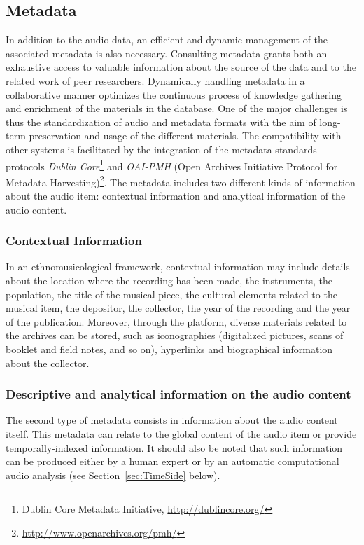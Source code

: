 \documentclass{sig-alternate}
\begin{document}
\subsection{Metadata}\label{sec:metadata}
In addition to the audio data, an efficient and dynamic management of the associated metadata is also necessary. Consulting metadata grants both an exhaustive access to valuable information about the source of the data and to the related work of peer researchers. 
Dynamically handling metadata in a collaborative manner optimizes the continuous process of knowledge gathering and enrichment of the materials in the database.  
One of the major challenges is thus the standardization of audio and metadata formats with the aim of long-term preservation and usage of the different materials.
The compatibility with other systems is facilitated by the integration of the metadata standards protocols \emph{Dublin Core}\footnote{{Dublin Core} Metadata Initiative, \url{http://dublincore.org/}} and \emph{OAI-PMH} (Open Archives Initiative Protocol for Metadata Harvesting)\footnote{\url{http://www.openarchives.org/pmh/}}.
The metadata includes two different kinds of information about the audio item: contextual information and analytical information of the audio content.
\subsubsection{Contextual Information}
In an ethnomusicological framework, contextual information may include details about the location where the recording has been made, the instruments, the population, the title of the musical piece, the cultural elements related to the musical item, the depositor, the collector, the year of the recording and the year of the publication. 
Moreover, through the platform, diverse materials related to the archives can be stored, such as iconographies (digitalized pictures, scans of booklet and field notes, and so on), hyperlinks and biographical information about the collector. 

\subsubsection{Descriptive and analytical information on the audio content}
The second type of metadata consists in information about the audio content itself. This metadata can relate to the global content of the audio item or provide temporally-indexed information. It should also be noted that such information can be produced either by a human expert or by an automatic computational audio analysis (see Section~\ref{sec:TimeSide} below).
\end{document}
